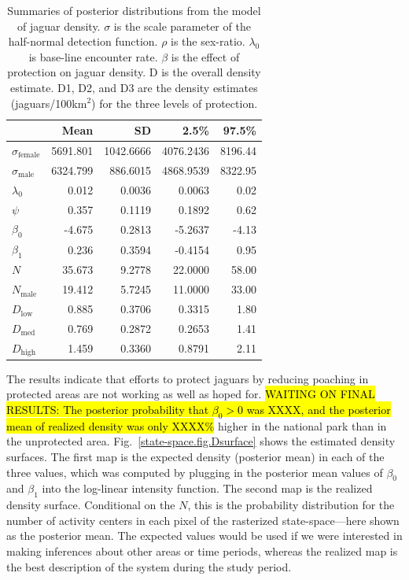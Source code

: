 \begin{table}
\centering
\caption{Summaries of posterior distributions from the model of jaguar
  density. $\sigma$ is the scale parameter of
  the half-normal detection function. $\rho$ is the
  sex-ratio. $\lambda_0$ is base-line encounter rate. $\beta$ is the
  effect of protection on jaguar density. D is the overall density
  estimate. D1, D2, and D3 are the density estimates
  (jaguars/100km$^2$) for the three levels of protection. }
\begin{tabular}{lrrrr}
\hline
& Mean & SD & 2.5\% & 97.5\% \\
\hline
 $\sigma_\text{female}$ 	& 5691.801 	& 1042.6666 	& 4076.2436 	& 8196.44 \\
 $\sigma_\text{male}$ 	& 6324.799 	&  886.6015 	& 4868.9539 	& 8322.95 \\
 $\lambda_0$ 	&    0.012 	&    0.0036 	&    0.0063 	&    0.02 \\
 $\psi$ 	&    0.357 	&    0.1119 	&    0.1892 	&    0.62 \\
 $\beta_0$ 	&   -4.675 	&    0.2813 	&   -5.2637 	&   -4.13 \\
 $\beta_1$ 	&    0.236 	&    0.3594 	&   -0.4154 	&    0.95 \\
 $N$ 	&   35.673 	&    9.2778 	&   22.0000 	&   58.00 \\
 $N_\text{male}$ 	&   19.412 	&    5.7245 	&   11.0000 	&   33.00 \\
 $D_\text{low}$ 	&    0.885 	&    0.3706 	&    0.3315 	&    1.80 \\
 $D_\text{med}$ 	&    0.769 	&    0.2872 	&    0.2653 	&    1.41 \\
 $D_\text{high}$ 	&    1.459 	&    0.3360 	&    0.8791 	&    2.11 \\
 \hline
\end{tabular}
\label{state-space.tab.jagposts}
\end{table}

The results indicate that efforts to protect jaguars by reducing
poaching in protected areas are not working as well as hoped
for. \hl{WAITING ON FINAL RESULTS: The
posterior probability that $\beta_0 > 0$ was XXXX, and
the posterior mean of realized density was only XXXX\%} higher in the national park than in the
unprotected area. Fig.~\ref{state-space.fig.Dsurface} shows the estimated
density surfaces. The first map is the expected density (posterior mean) in each of
the three values, which was computed by plugging in the posterior mean
values of $\beta_0$ and $\beta_1$ into the log-linear intensity
function. The second map is the realized density surface. Conditional
on the $N$, this is the probability distribution for the
number of activity centers in each pixel of the rasterized
state-space---here shown as the posterior mean. The expected values
would be used if we were interested in making inferences about other
areas or time periods, whereas the realized map is the best
description of the system during the study period.

